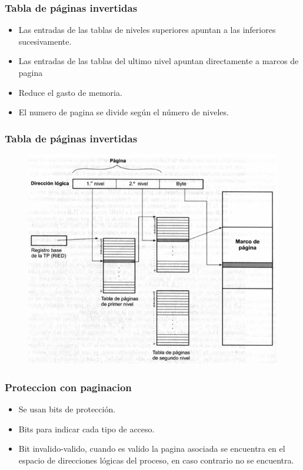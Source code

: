 \documentclass{beamer}
\begin{document}
\begin{frame}
	\frametitle{Tabla de páginas invertidas}
	
	\begin{itemize}
		\item Las entradas de las tablas de niveles superiores apuntan a las inferiores sucesivamente.
		\item Las entradas de las tablas del ultimo nivel apuntan directamente a marcos de pagina
		\item Reduce el gasto de memoria.
		\item El numero de pagina se divide según el número de niveles.
	\end{itemize}
	
\end{frame}

\begin{frame}
	\frametitle{Tabla de páginas invertidas}
	
	\begin{figure}[H]
		\centering
		\includegraphics[scale=0.37]{img/paginacion_multi.png}
	\end{figure}
\end{frame}


\begin{frame}
	\frametitle{Proteccion con paginacion}
	
	\begin{itemize}
		\item Se usan bits de protección.
		\item Bits para indicar cada tipo de acceso.
		\item Bit invalido-valido, cuando es valido la pagina asociada se encuentra en el espacio de direcciones lógicas del proceso, en caso contrario no se encuentra.
	\end{itemize}
\end{frame}
\end{document}
